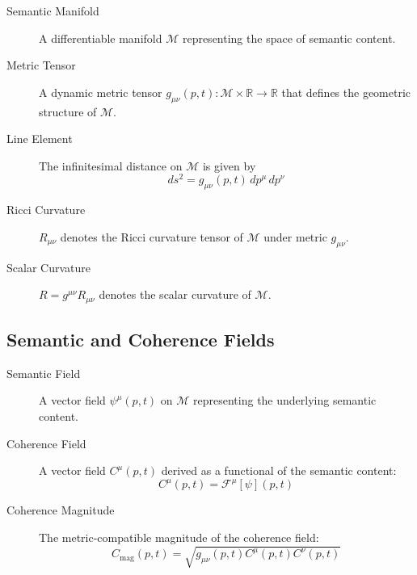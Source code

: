 \begin{description}
\item[Semantic Manifold] A differentiable manifold \(\mathcal{M}\) representing the space of semantic content.

\item[Metric Tensor] A dynamic metric tensor \(g_{\mu\nu}(p,t) : \mathcal{M} \times \mathbb{R} \rightarrow \mathbb{R}\) that defines the geometric structure of \(\mathcal{M}\).

\item[Line Element] The infinitesimal distance on \(\mathcal{M}\) is given by
\begin{equation}
ds^2 = g_{\mu\nu}(p,t) \, dp^\mu \, dp^\nu
\end{equation}

\item[Ricci Curvature] \(R_{\mu\nu}\) denotes the Ricci curvature tensor of \(\mathcal{M}\) under metric \(g_{\mu\nu}\).

\item[Scalar Curvature] \(R = g^{\mu\nu}R_{\mu\nu}\) denotes the scalar curvature of \(\mathcal{M}\).

\end{description}


\subsection{Semantic and Coherence Fields}
\label{1.1.2:semantic_and_coherence_fields}

\begin{description}

\item[Semantic Field] A vector field \(\psi^\mu(p,t)\) on \(\mathcal{M}\) representing the underlying semantic content.

\item[Coherence Field] A vector field \(C^\mu(p,t)\) derived as a functional of the semantic content:
\begin{equation}
C^\mu(p,t) = \mathcal{F}^\mu[\psi](p,t)
\end{equation}

\item[Coherence Magnitude] The metric-compatible magnitude of the coherence field:
\begin{equation}
C_{\text{mag}}(p,t) = \sqrt{g_{\mu\nu}(p,t) C^\mu(p,t) C^\nu(p,t)}
\end{equation}

\end{description}

